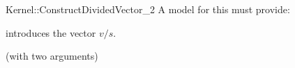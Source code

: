\begin{ccRefFunctionObjectConcept}{Kernel::ConstructDividedVector_2}
A model for this must provide:


            {introduces the vector $v/s$.}


\ccRefines
{} (with two arguments)

\ccSeeAlso
{}\\

\end{ccRefFunctionObjectConcept}

